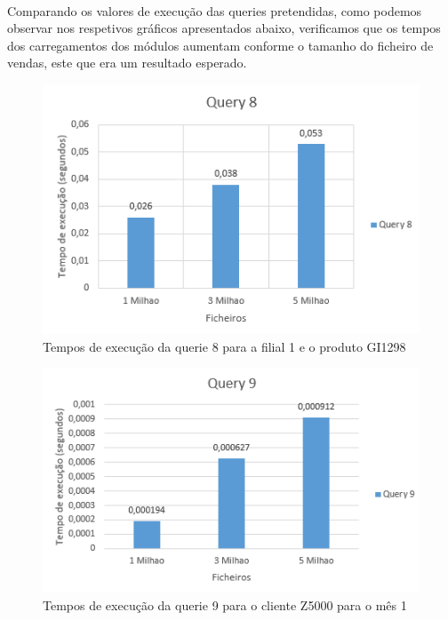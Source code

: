 \paragraph{}
Comparando os valores de execução das queries pretendidas, como podemos observar nos respetivos gráficos apresentados abaixo, verificamos que os tempos dos carregamentos dos módulos aumentam conforme o tamanho do ficheiro de vendas, este que era um resultado esperado. 

  	\begin{minipage}{0.45\linewidth}
  		\begin{figure}[H]
  			\includegraphics[width=\linewidth]{grafq8}
  			\caption{Tempos de execução da querie 8 para a filial 1 e o produto GI1298}
  		\end{figure}
  	\end{minipage}
  	\hspace{0.05\linewidth}
  	\begin{minipage}{0.45\linewidth}
  		\begin{figure}[H]
  			\includegraphics[width=\linewidth]{grafq9}
  			\caption{Tempos de execução da querie 9 para o cliente Z5000 para o mês 1}
  		\end{figure}
  	\end{minipage}
  	
